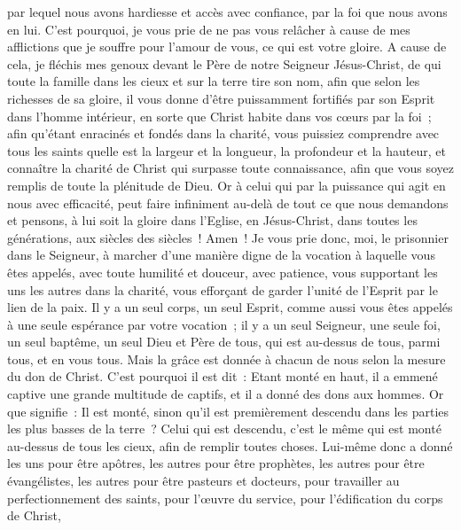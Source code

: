 \begin{multicols}{2}
par lequel nous avons hardiesse et accès avec confiance, par la foi que nous avons en lui.
C'est pourquoi, je vous prie de ne pas vous relâcher à cause de mes afflictions que je souffre pour l'amour de vous, ce qui est votre gloire.
A cause de cela, je fléchis mes genoux devant le Père de notre Seigneur Jésus-Christ,
de qui toute la famille dans les cieux et sur la terre tire son nom,
afin que selon les richesses de sa gloire, il vous donne d'être puissamment fortifiés par son Esprit dans l'homme intérieur,
en sorte que Christ habite dans vos cœurs par la foi~; afin qu'étant enracinés et fondés dans la charité,
vous puissiez comprendre avec tous les saints quelle est la largeur et la longueur, la profondeur et la hauteur,
et connaître la charité de Christ qui surpasse toute connaissance, afin que vous soyez remplis de toute la plénitude de Dieu.
Or à celui qui par la puissance qui agit en nous avec efficacité, peut faire infiniment au-delà de tout ce que nous demandons et pensons,
à lui soit la gloire dans l'Eglise, en Jésus-Christ, dans toutes les générations, aux siècles des siècles~! Amen~!
\VerseOne{}Je vous prie donc, moi, le prisonnier dans le Seigneur, à marcher d'une manière digne de la vocation à laquelle vous êtes appelés,
avec toute humilité et douceur, avec patience, vous supportant les uns les autres dans la charité,
vous efforçant de garder l'unité de l'Esprit par le lien de la paix.
Il y a un seul corps, un seul Esprit, comme aussi vous êtes appelés à une seule espérance par votre vocation~;
il y a un seul Seigneur, une seule foi, un seul baptême,
un seul Dieu et Père de tous, qui est au-dessus de tous, parmi tous, et en vous tous.
Mais la grâce est donnée à chacun de nous selon la mesure du don de Christ.
C'est pourquoi il est dit~: Etant monté en haut, il a emmené captive une grande multitude de captifs, et il a donné des dons aux hommes.
Or que signifie~: Il est monté, sinon qu'il est premièrement descendu dans les parties les plus basses de la terre~?
Celui qui est descendu, c'est le même qui est monté au-dessus de tous les cieux, afin de remplir toutes choses.
Lui-même donc a donné les uns pour être apôtres, les autres pour être prophètes, les autres pour être évangélistes, les autres pour être pasteurs et docteurs,
pour travailler au perfectionnement des saints, pour l'œuvre du service, pour l'édification du corps de Christ,

\end{multicols}
